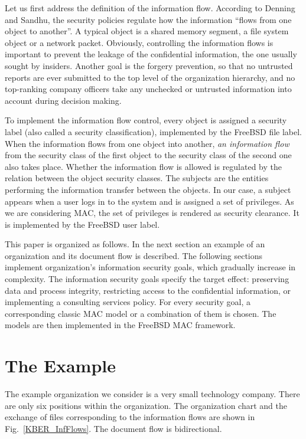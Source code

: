 \documentclass[10pt,a4paper,conference,onecolumn]{IEEEtran}
\begin{document}
Let us first address the definition of the information flow. 
According to Denning and Sandhu,
the security policies regulate how the information ``flows from 
one object to another''. A typical object is 
a shared memory segment, a file system object or a network 
packet. Obviously, controlling the information flows is important
to prevent the leakage of the confidential information, the one
usually sought by insiders. Another goal is the forgery 
prevention, so that
no untrusted reports are ever submitted to the top level
of the organization hierarchy, and no top-ranking company
officers take any unchecked or untrusted information into
account during decision making.

To implement the information flow control, every object is assigned a 
security label (also called 
a security classification), implemented by the FreeBSD file label. 
When the information flows from one object 
into another, \emph{an information flow} from the security class of the 
first object to the security class of the second one also takes 
place. Whether the information flow is allowed is regulated by the 
relation between the object security classes.
The subjects are the entities performing the information transfer
between the objects. In our case, a subject appears when a user
logs in to the system and is assigned a set of privileges. As we are 
considering MAC, the set of privileges is rendered as security clearance.
It is implemented by the FreeBSD user label.

This paper is organized as follows. In the next section an example
of an organization and its document flow is described. The following
sections implement organization's information security goals, which gradually 
increase in complexity. The information security goals
specify the target effect: preserving data and process integrity, restricting access
to the confidential information, or implementing a consulting services policy.
For every security goal, a corresponding classic MAC model or a
combination of them is chosen. The models are then implemented in the
FreeBSD MAC framework.

\section{The Example}

The example organization we consider is a very small technology company. There are
only six positions within the organization. The organization chart and the exchange 
of files corresponding to the information flows are shown in Fig.~\ref{KBER_InfFlows}. 
The document flow is bidirectional. 
\end{document}

